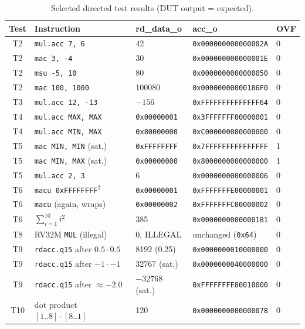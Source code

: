 \documentclass[11pt,a4paper]{report}
\newcommand{\code}[1]{\texttt{#1}}
\begin{document}
\begin{table}[H]
  \centering
  \caption{Selected directed test results (DUT output = expected).}
  \label{tab:directed}
  \scriptsize
  \begin{tabular}{@{}cllll@{}}
    \toprule
    Test & Instruction & rd\_data\_o & acc\_o & OVF \\
    \midrule
    T2 & \code{mul.acc 7, 6}        & 42            & \code{0x000000000000002A} & 0 \\
    T2 & \code{mac 3, -4}           & 30            & \code{0x000000000000001E} & 0 \\
    T2 & \code{msu -5, 10}          & 80            & \code{0x0000000000000050} & 0 \\
    T2 & \code{mac 100, 1000}       & 100080        & \code{0x00000000000186F0} & 0 \\
    T3 & \code{mul.acc 12, -13}     & $-156$        & \code{0xFFFFFFFFFFFFFF64} & 0 \\
    T4 & \code{mul.acc MAX, MAX}    & \code{0x00000001} & \code{0x3FFFFFFF00000001} & 0 \\
    T4 & \code{mul.acc MIN, MAX}    & \code{0x80000000} & \code{0xC000000080000000} & 0 \\
    T5 & \code{mac MIN, MIN} (sat.) & \code{0xFFFFFFFF} & \code{0x7FFFFFFFFFFFFFFF} & 1 \\
    T5 & \code{mac MIN, MAX} (sat.) & \code{0x00000000} & \code{0x8000000000000000} & 1 \\
    T5 & \code{mul.acc 2, 3}        & 6             & \code{0x0000000000000006} & 0 \\
    T6 & \code{macu 0xFFFFFFFF$^2$} & \code{0x00000001} & \code{0xFFFFFFFE00000001} & 0 \\
    T6 & \code{macu} (again, wraps) & \code{0x00000002} & \code{0xFFFFFFFC00000002} & 0 \\
    T6 & $\sum_{i=1}^{10}i^2$       & 385           & \code{0x0000000000000181} & 0 \\
    T8 & RV32M \code{MUL} (illegal) & 0, ILLEGAL    & unchanged (\code{0x64}) & 0 \\
    T9 & \code{rdacc.q15} after $0.5\cdot0.5$   & 8192 (0.25)   & \code{0x0000000010000000} & 0 \\
    T9 & \code{rdacc.q15} after $-1\cdot-1$     & 32767 (sat.)  & \code{0x0000000040000000} & 0 \\
    T9 & \code{rdacc.q15} after $\approx -2.0$  & $-32768$ (sat.) & \code{0xFFFFFFFF80010000} & 0 \\
    T10& dot product $[1..8]\cdot[8..1]$       & 120           & \code{0x0000000000000078} & 0 \\
    \bottomrule
  \end{tabular}
\end{table}
\end{document}
